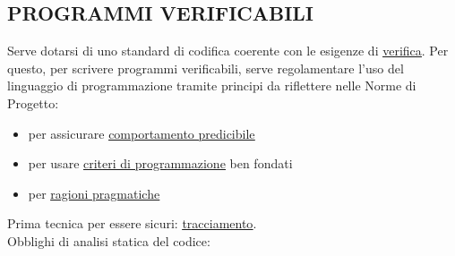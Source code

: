 		\subsection{PROGRAMMI VERIFICABILI}		\label{programmiverificabili} %
		Serve dotarsi di uno standard di codifica coerente con le esigenze di \underline{\hyperref[verificare]{verifica}}. Per questo, per scrivere programmi verificabili, serve regolamentare l’uso del linguaggio di programmazione tramite principi da riflettere nelle Norme di Progetto:
		\begin{itemize}
			\item per assicurare \underline{\hyperref[comportamentopredicibile]{comportamento predicibile}}
			\item per usare \underline{\hyperref[criteriprog]{criteri di programmazione}} ben fondati
			\item per \underline{\hyperref[pragmatico]{ragioni pragmatiche}}
		\end{itemize}
		Prima tecnica per essere sicuri: \underline{\hyperref[tracciamento]{tracciamento}}. \\
		Obblighi di analisi statica del codice: %
